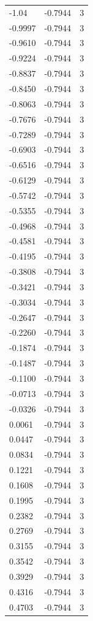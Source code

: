 \begin{longtable}{lrr}
  -1.04 & -0.7944 & 3 \\
  -0.9997 & -0.7944 & 3 \\
  -0.9610 & -0.7944 & 3 \\
  -0.9224 & -0.7944 & 3 \\
  -0.8837 & -0.7944 & 3 \\
  -0.8450 & -0.7944 & 3 \\
  -0.8063 & -0.7944 & 3 \\
  -0.7676 & -0.7944 & 3 \\
  -0.7289 & -0.7944 & 3 \\
  -0.6903 & -0.7944 & 3 \\
  -0.6516 & -0.7944 & 3 \\
  -0.6129 & -0.7944 & 3 \\
  -0.5742 & -0.7944 & 3 \\
  -0.5355 & -0.7944 & 3 \\
  -0.4968 & -0.7944 & 3 \\
  -0.4581 & -0.7944 & 3 \\
  -0.4195 & -0.7944 & 3 \\
  -0.3808 & -0.7944 & 3 \\
  -0.3421 & -0.7944 & 3 \\
  -0.3034 & -0.7944 & 3 \\
  -0.2647 & -0.7944 & 3 \\
  -0.2260 & -0.7944 & 3 \\
  -0.1874 & -0.7944 & 3 \\
  -0.1487 & -0.7944 & 3 \\
  -0.1100 & -0.7944 & 3 \\
  -0.0713 & -0.7944 & 3 \\
  -0.0326 & -0.7944 & 3 \\
  0.0061 & -0.7944 & 3 \\
  0.0447 & -0.7944 & 3 \\
  0.0834 & -0.7944 & 3 \\
  0.1221 & -0.7944 & 3 \\
  0.1608 & -0.7944 & 3 \\
  0.1995 & -0.7944 & 3 \\
  0.2382 & -0.7944 & 3 \\
  0.2769 & -0.7944 & 3 \\
  0.3155 & -0.7944 & 3 \\
  0.3542 & -0.7944 & 3 \\
  0.3929 & -0.7944 & 3 \\
  0.4316 & -0.7944 & 3 \\
  0.4703 & -0.7944 & 3 \\

\end{longtable}
